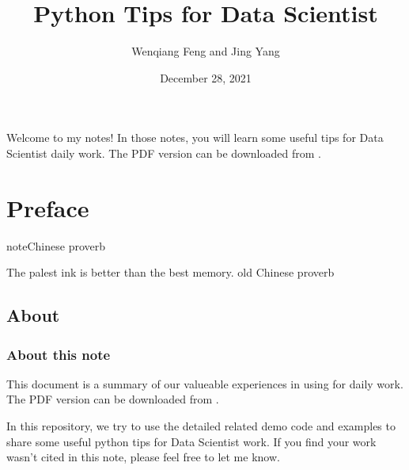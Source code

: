 \documentclass[letterpaper,12pt,english]{sphinxmanual}
\title{Python Tips for Data Scientist}
\date{December 28, 2021}
\author{Wenqiang Feng and Jing Yang}
\begin{document}
\pagestyle{empty}
\sphinxmaketitle
\pagestyle{plain}
\sphinxtableofcontents
\pagestyle{normal}
\label{\detokenize{index::doc}}\label{\detokenize{index:index}}\begin{quote}

\begin{figure}[htbp]
\centering

\noindent{}
\end{figure}
\end{quote}

\sphinxAtStartPar
Welcome to my  notes! In those notes, you will learn some useful tips for Data Scientist daily work. The PDF version can be downloaded from .




\chapter{Preface}
\label{\detokenize{preface:preface}}\label{\detokenize{preface:id1}}\label{\detokenize{preface::doc}}
\begin{sphinxadmonition}{note}{Chinese proverb}

\sphinxAtStartPar
The palest ink is better than the best memory. \textendash{} old Chinese proverb
\end{sphinxadmonition}


\section{About}
\label{\detokenize{preface:about}}

\subsection{About this note}
\label{\detokenize{preface:about-this-note}}
\sphinxAtStartPar
This document is a summary of our valueable experiences in using 
for  daily work. The PDF version can be downloaded from .

\sphinxAtStartPar
{}

\sphinxAtStartPar
In this repository, we try to use the detailed  related demo code and
examples to share some useful python tips for Data Scientist work. If you
find your work wasn’t cited in this note, please feel free to let me know.
\end{document}
